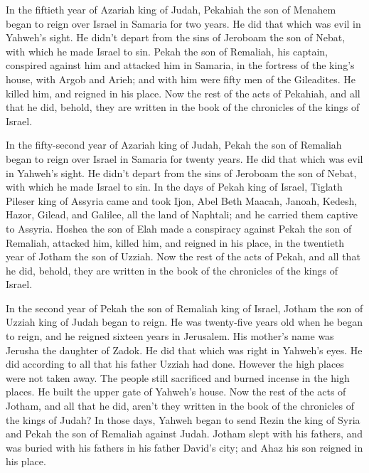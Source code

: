  In the fiftieth year of Azariah king of Judah, Pekahiah
the son of Menahem began to reign over Israel in Samaria for two years.
 He did that which was evil in Yahweh's sight. He didn't
depart from the sins of Jeroboam the son of Nebat, with which he made
Israel to sin.  Pekah the son of Remaliah, his captain,
conspired against him and attacked him in Samaria, in the fortress of
the king's house, with Argob and Arieh; and with him were fifty men of
the Gileadites. He killed him, and reigned in his place. 
Now the rest of the acts of Pekahiah, and all that he did, behold, they
are written in the book of the chronicles of the kings of Israel.

 In the fifty-second year of Azariah king of Judah, Pekah
the son of Remaliah began to reign over Israel in Samaria for twenty
years.  He did that which was evil in Yahweh's sight. He
didn't depart from the sins of Jeroboam the son of Nebat, with which he
made Israel to sin.  In the days of Pekah king of Israel,
Tiglath Pileser king of Assyria came and took Ijon, Abel Beth Maacah,
Janoah, Kedesh, Hazor, Gilead, and Galilee, all the land of Naphtali;
and he carried them captive to Assyria.  Hoshea the son
of Elah made a conspiracy against Pekah the son of Remaliah, attacked
him, killed him, and reigned in his place, in the twentieth year of
Jotham the son of Uzziah.  Now the rest of the acts of
Pekah, and all that he did, behold, they are written in the book of the
chronicles of the kings of Israel.

 In the second year of Pekah the son of Remaliah king of
Israel, Jotham the son of Uzziah king of Judah began to reign.
 He was twenty-five years old when he began to reign, and
he reigned sixteen years in Jerusalem. His mother's name was Jerusha the
daughter of Zadok.  He did that which was right in
Yahweh's eyes. He did according to all that his father Uzziah had done.
 However the high places were not taken away. The people
still sacrificed and burned incense in the high places. He built the
upper gate of Yahweh's house.  Now the rest of the acts
of Jotham, and all that he did, aren't they written in the book of the
chronicles of the kings of Judah?  In those days, Yahweh
began to send Rezin the king of Syria and Pekah the son of Remaliah
against Judah.  Jotham slept with his fathers, and was
buried with his fathers in his father David's city; and Ahaz his son
reigned in his place.


